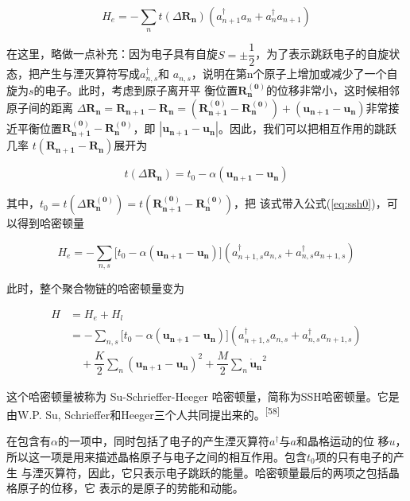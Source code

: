 \documentclass[12pt,]{report}
\begin{document}
\begin{equation}\label{eq:ssh0}
H_e = - \sum\limits_n t(\Delta\bm{R_n})(a_{n+1}^{\dagger} a_{n} + a_n^{\dagger}
a_{n+1})
\end{equation}

\noindent
在这里，略做一点补充：因为电子具有自旋\(S = \pm \dfrac{1}{2}\)，为了表示跳跃电子的自旋状态，把产生与湮灭算符写成\(a_{n,s}^\dagger\)和
\(a_{n,s}\)，说明在第n个原子上增加或减少了一个自旋为\(s\)的电子。此时，考虑到原子离开平
衡位置\(\bm{R_n^{(0)}}\)的位移非常小，这时候相邻原子间的距离
\(\Delta\bm{R_n}=\bm{R_{n+1}} - \bm{R_{n}} = (\bm{R_{n+1}^{(0)}} - \bm{R_{n}^{(0)}}) + (\bm{u_{n+1}}-\bm{u_n})\)非常接近平衡位置\(\bm{R_{n+1}^{(0)}} - \bm{R_n^{(0)}}\)，即
\(\left|\bm{u_{n+1}} - \bm{u_n}\right|\)。因此，我们可以把相互作用的跳跃几率
\(t(\bm{R_{n+1}}-\bm{R_n})\)展开为

\begin{equation}
t(\Delta\bm{R_{n}}) = t_0 - \alpha(\bm{u_{n+1}}-\bm{u_n})
\end{equation}

其中，\(t_0 = t(\Delta\bm{R_n^{(0)}}) = t(\bm{R_{n+1}^{(0)}} - \bm{R_{n}^{(0)}})\)，把
该式带入公式(\ref{eq:ssh0})，可以得到哈密顿量

\begin{equation} \label{eq:ssh_e}
H_e = - \sum\limits_{n,s} \Big[ t_0 - \alpha (\bm{u_{n+1}}-\bm{u_n})
\Big](a_{n+1,s}^\dagger a_{n,s} + a_{n,s}^\dagger a_{n+1,s})
\end{equation}

\noindent
此时，整个聚合物链的哈密顿量变为

\begin{equation}
\begin{split}
H & = H_e + H_l \\
  & = -\sum\limits_{n,s} \Big[ t_0 - \alpha (\bm{u_{n+1}}-\bm{u_n})
  \Big](a_{n+1,s}^\dagger a_{n,s} + a_{n,s}^\dagger a_{n+1,s}) \\ 
  &  \quad + \dfrac{K}{2} \sum\limits_n (\bm{u_{n+1}} - \bm{u_n})^2 +
  \dfrac{M}{2}\sum\limits_n \bm{\dot{u}_n}^2
\end{split}
\end{equation}

这个哈密顿量被称为 Su-Schrieffer-Heeger
哈密顿量，简称为SSH哈密顿量。它是由W.P. Su,
Schrieffer和Heeger三个人共同提出来的。\textsuperscript{{[}58{]}}

\noindent
在包含有\(\alpha\)的一项中，同时包括了电子的产生湮灭算符\(a^\dagger\)与\(a\)和晶格运动的位
移\(u\)，所以这一项是用来描述晶格原子与电子之间的相互作用。包含\(t_0\)项的只有电子的产生
与湮灭算符，因此，它只表示电子跳跃的能量。哈密顿量最后的两项之包括晶格原子的位移，它
表示的是原子的势能和动能。
\end{document}

